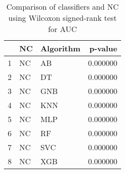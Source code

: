 \begin{table}
\footnotesize
\caption{Comparison of classifiers and NC using Wilcoxon signed-rank test for AUC}
\label{tab:NC wilcoxon AUC comparison}
\begin{tabular}{lllr}
\hline
 & NC & Algorithm & p-value \\
\hline
1 & NC & AB & 0.000000 \\
2 & NC & DT & 0.000000 \\
3 & NC & GNB & 0.000000 \\
4 & NC & KNN & 0.000000 \\
5 & NC & MLP & 0.000000 \\
6 & NC & RF & 0.000000 \\
7 & NC & SVC & 0.000000 \\
8 & NC & XGB & 0.000000 \\
\hline
\end{tabular}
\end{table}
